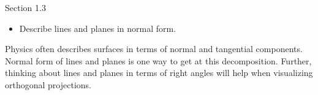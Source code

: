 \begin{lesson}

	Section 1.3

	\begin{itemize}
		\item Describe lines and planes in normal form.
	\end{itemize}

	Physics often describes surfaces in terms of normal and tangential components.
	Normal form of lines and planes is one way to get at this decomposition. Further, thinking
	about lines and planes in terms of right angles will help when visualizing orthogonal projections.

\end{lesson}

